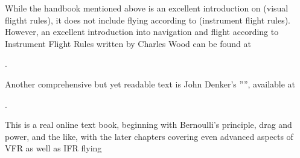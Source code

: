 While the handbook mentioned above is an excellent introduction on  (visual
fligtht rules), it does not include flying according to  (instrument flight
rules). However, an excellent introduction into navigation and flight according to
Instrument Flight Rules written by Charles Wood can be found at

.

Another comprehensive but yet readable text is John Denker's
'''', available at
\medskip

.
\medskip

 \noindent
This is a real online text book, beginning with Bernoulli's principle, drag and power,
and the like, with the later chapters covering even advanced aspects of VFR as well as
IFR flying


